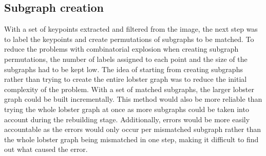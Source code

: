 \subsection{Subgraph creation}
With a set of keypoints extracted and filtered from the image, the next step was to label the keypoints and create permutations of subgraphs to be matched. To reduce the problems with combinatorial explosion when creating subgraph permutations, the number of labels assigned to each point and the size of the subgraphs had to be kept low. The idea of starting from creating subgraphs rather than trying to create the entire lobster graph was to reduce the initial complexity of the problem. With a set of matched subgraphs, the larger lobster graph could be built incrementally. This method would also be more reliable than trying the whole lobster graph at once as more subgraphs could be taken into account during the rebuilding stage. Additionally, errors would be more easily accountable as the errors would only occur per mismatched subgraph rather than the whole lobster graph being mismatched in one step, making it difficult to find out what caused the error. 

